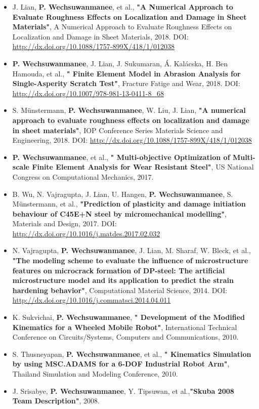 \begin{itemize}
    \item
    J. Lian, \textbf{P. Wechsuwanmanee}, et al., \textbf{"A Numerical Approach to Evaluate Roughness Effects on Localization and Damage in Sheet Materials"}, A Numerical Approach to Evaluate Roughness Effects on Localization and Damage in Sheet Materials, 2018. DOI: \url{http://dx.doi.org/10.1088/1757-899X/418/1/012038}
    
    \item
    \textbf{P. Wechsuwanmanee}, J. Lian, J. Sukumaran, Á. Kalácska, H. Ben Hamouda, et al., \textbf{"
    Finite Element Model in Abrasion Analysis for Single-Asperity Scratch Test"}, Fracture Fatige and Wear, 2018. DOI: \url{http://dx.doi.org/10.1007/978-981-13-0411-8_68}
    
    \item
    S. Münstermann, \textbf{P. Wechsuwanmanee}, W. Liu, J. Lian, \textbf{"A numerical approach to evaluate roughness effects on localization and damage in sheet materials"}, IOP Conference Series Materials Science and Engineering, 2018. DOI: \url{http://dx.doi.org/10.1088/1757-899X/418/1/012038}
    
    \item
    \textbf{P. Wechsuwanmanee}, et al., \textbf{"
    Multi-objective Optimization of Multi-scale Finite Element Analysis for Wear Resistant Steel"}, US National Congress on Computational Mechanics, 2017.
    
    \item
    B. Wu, N. Vajragupta, J. Lian, U. Hangen, \textbf{P. Wechsuwanmanee}, S. Münstermann, et al., \textbf{"Prediction of plasticity and damage initiation behaviour of C45E+N steel by micromechanical modelling"}, Materials and Design, 2017. DOI: \url{http://dx.doi.org/10.1016/j.matdes.2017.02.032}
    
    
    \item
    N. Vajragupta, \textbf{P. Wechsuwanmanee}, J. Lian, M. Sharaf, W. Bleck, et al., \textbf{"The modeling scheme to evaluate the influence of microstructure features on microcrack formation of DP-steel: The artificial microstructure model and its application to predict the strain hardening behavior"}, Computational Material Science, 2014. DOI: \url{http://dx.doi.org/10.1016/j.commatsci.2014.04.011}
    
    \item
    K. Sukvichai, \textbf{P. Wechsuwanmanee}, \textbf{"
    Development of the Modified Kinematics for a Wheeled Mobile Robot"}, International Technical Conference on Circuits/Systems, Computers and Communications, 2010.
    
    \item
    S. Thusneyapan, \textbf{P. Wechsuwanmanee}, et al., \textbf{"
    Kinematics Simulation by using MSC.ADAMS for a 6-DOF Industrial Robot Arm"}, Thailand Simulation and Modeling Conference, 2010. 
    
    \item
    J. Srisabye, \textbf{P. Wechsuwanmanee}, Y. Tipsuwan, et al.,\textbf{"Skuba 2008 Team Description"}, 2008.
    
    \end{itemize}